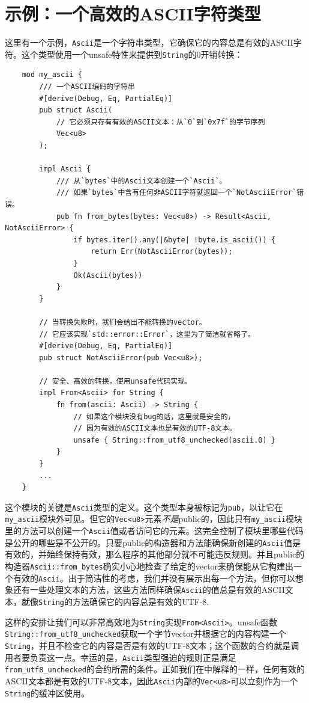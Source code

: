 \section{示例：一个高效的ASCII字符类型}
这里有一个示例，\texttt{Ascii}是一个字符串类型，它确保它的内容总是有效的ASCII字符。这个类型使用一个unsafe特性来提供到\texttt{String}的0开销转换：
\begin{verbatim}
    mod my_ascii {
        /// 一个ASCII编码的字符串
        #[derive(Debug, Eq, PartialEq)]
        pub struct Ascii(
            // 它必须只存有有效的ASCII文本：从`0`到`0x7f`的字节序列
            Vec<u8>
        );

        impl Ascii {
            /// 从`bytes`中的Ascii文本创建一个`Ascii`。
            /// 如果`bytes`中含有任何非ASCII字符就返回一个`NotAsciiError`错误。
            pub fn from_bytes(bytes: Vec<u8>) -> Result<Ascii, NotAsciiError> {
                if bytes.iter().any(|&byte| !byte.is_ascii()) {
                    return Err(NotAsciiError(bytes));
                }
                Ok(Ascii(bytes))
            }
        }

        // 当转换失败时，我们会给出不能转换的vector。
        // 它应该实现`std::error::Error`，这里为了简洁就省略了。
        #[derive(Debug, Eq, PartialEq)]
        pub struct NotAsciiError(pub Vec<u8>);

        // 安全、高效的转换，使用unsafe代码实现。
        impl From<Ascii> for String {
            fn from(ascii: Ascii) -> String {
                // 如果这个模块没有bug的话，这里就是安全的，
                // 因为有效的ASCII文本也是有效的UTF-8文本。
                unsafe { String::from_utf8_unchecked(ascii.0) }
            }
        }
        ...
    }
\end{verbatim}

这个模块的关键是\texttt{Ascii}类型的定义。这个类型本身被标记为\texttt{pub}，以让它在\texttt{my\_ascii}模块外可见。但它的\texttt{Vec<u8>}元素\emph{不是}public的，因此只有\texttt{my\_ascii}模块里的方法可以创建一个\texttt{Ascii}值或者访问它的元素。这完全控制了模块里哪些代码是公开的哪些是不公开的。只要public的构造器和方法能确保新创建的\texttt{Ascii}值是有效的，并始终保持有效，那么程序的其他部分就不可能违反规则。并且public的构造器\texttt{Ascii::from\_bytes}确实小心地检查了给定的vector来确保能从它构建出一个有效的\texttt{Ascii}。出于简洁性的考虑，我们并没有展示出每一个方法，但你可以想象还有一些处理文本的方法，这些方法同样确保\texttt{Ascii}的值总是有效的ASCII文本，就像\texttt{String}的方法确保它的内容总是有效的UTF-8.

这样的安排让我们可以非常高效地为\texttt{String}实现\texttt{From<Ascii>}。unsafe函数\\
\texttt{String::from\_utf8\_unchecked}获取一个字节vector并根据它的内容构建一个\texttt{String}，并且不检查它的内容是否是有效的UTF-8文本；这个函数的合约就是调用者要负责这一点。幸运的是，\texttt{Ascii}类型强迫的规则正是满足\texttt{from\_utf8\_unchecked}的合约所需的条件。正如我们在中解释的一样，任何有效的ASCII文本都是有效的UTF-8文本，因此\texttt{Ascii}内部的\texttt{Vec<u8>}可以立刻作为一个\texttt{String}的缓冲区使用。

